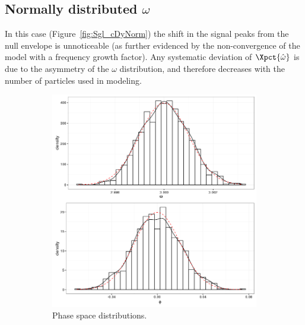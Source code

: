 \documentclass{article}
\begin{document}
\subsection{Normally distributed $\omega$}
In this case (Figure~\ref{fig:Sgl_cDyNorm}) the shift in the signal peaks from the null envelope is unnoticeable (as further evidenced by the non-convergence of the model with a frequency growth factor). Any systematic deviation of $\Xpct{\hat{\omega}}$ is due to the asymmetry of the $\omega$ distribution, and therefore decreases with the number of particles used in modeling.
\begin{figure}[h]
	\begin{subfigure}{.5\textwidth}
		\centering
		\includegraphics[scale=.5]{../img/PS_dist_Norm}
		\caption{Phase space distributions.}
	\end{subfigure}~
	\begin{subfigure}{.5\textwidth}
		\centering

\end{subfigure}
\end{figure}
\end{document}
